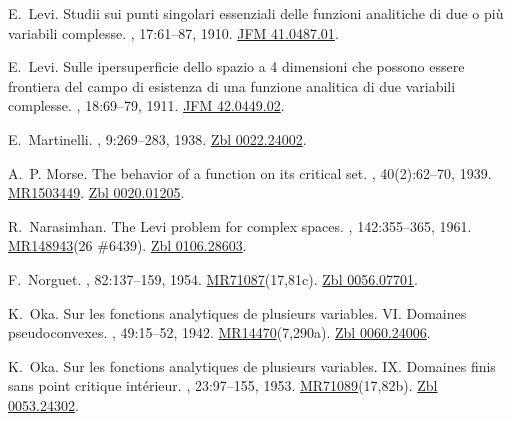 \documentclass[11pt,a4paper, final, twoside]{article}
\numberwithin{equation}{section}
\begin{document}
\begin{thebibliography}{10}
E.~Levi.
\newblock Studii sui punti singolari essenziali delle funzioni analitiche di
  due o pi\`u variabili complesse.
, 17:61--87, 1910.
\newblock \href{http://zbmath.org/?q=an:41.0487.01}{JFM 41.0487.01}.

E.~Levi.
\newblock Sulle ipersuperficie dello spazio a 4 dimensioni che possono essere
  frontiera del campo di esistenza di una funzione analitica di due variabili
  complesse.
, 18:69--79, 1911.
\newblock \href{http://zbmath.org/?q=an:42.0449.02}{JFM 42.0449.02}.

E.~Martinelli.
, 9:269--283, 1938.
\newblock \href{http://zbmath.org/?q=an:0022.24002}{Zbl 0022.24002}.

A.~P. Morse.
\newblock The behavior of a function on its critical set.
, 40(2):62--70, 1939.
\newblock \href{http://www.ams.org/mathscinet-getitem?mr=1503449}{MR1503449}.
  \href{http://zbmath.org/?q=an:0020.01205}{Zbl 0020.01205}.

R.~Narasimhan.
\newblock The {L}evi problem for complex spaces.
, 142:355--365, 1961.
\newblock \href{http://www.ams.org/mathscinet-getitem?mr=148943}{MR148943}(26
  \#6439). \href{http://zbmath.org/?q=an:0106.28603}{Zbl 0106.28603}.

F.~Norguet.
,
  82:137--159, 1954.
\newblock
  \href{http://www.ams.org/mathscinet-getitem?mr=71087}{MR71087}(17,81c).
  \href{http://zbmath.org/?q=an:0056.07701}{Zbl 0056.07701}.

K.~Oka.
\newblock Sur les fonctions analytiques de plusieurs variables. {VI}.
  {D}omaines pseudoconvexes.
, 49:15--52, 1942.
\newblock
  \href{http://www.ams.org/mathscinet-getitem?mr=14470}{MR14470}(7,290a).
  \href{http://zbmath.org/?q=an:0060.24006}{Zbl 0060.24006}.

K.~Oka.
\newblock Sur les fonctions analytiques de plusieurs variables. {IX}.
  {D}omaines finis sans point critique int{\'e}rieur.
, 23:97--155, 1953.
\newblock
  \href{http://www.ams.org/mathscinet-getitem?mr=71089}{MR71089}(17,82b).
  \href{http://zbmath.org/?q=an:0053.24302}{Zbl 0053.24302}.


\end{thebibliography}
\end{document}
